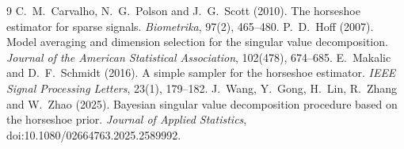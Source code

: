 \documentclass[11pt]{article}
\begin{document}
\begin{thebibliography}{9}
 C.~M.~Carvalho, N.~G.~Polson and J.~G.~Scott (2010). The horseshoe estimator for sparse signals.
  \emph{Biometrika}, 97(2), 465--480.
 P.~D.~Hoff (2007). Model averaging and dimension selection for the singular value decomposition.
  \emph{Journal of the American Statistical Association}, 102(478), 674--685.
 E.~Makalic and D.~F.~Schmidt (2016). A simple sampler for the horseshoe estimator.
  \emph{IEEE Signal Processing Letters}, 23(1), 179--182.
 J.~Wang, Y.~Gong, H.~Lin, R.~Zhang and W.~Zhao (2025). Bayesian singular value decomposition procedure
  based on the horseshoe prior. \emph{Journal of Applied Statistics}, doi:10.1080/02664763.2025.2589992.
\end{thebibliography}
\end{document}

